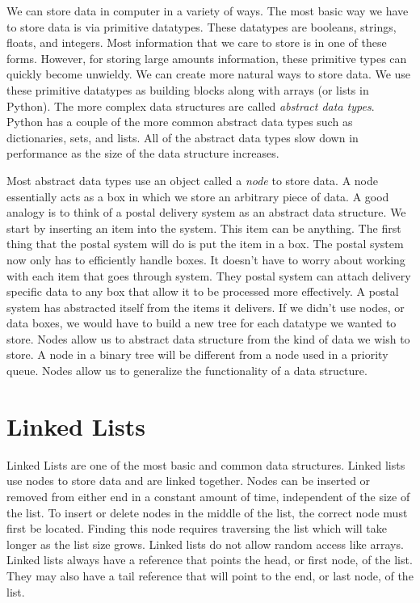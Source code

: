 \label{lab:Python_DataStructures}

We can store data in computer in a variety of ways.
The most basic way we have to store data is via primitive datatypes.
These datatypes are booleans, strings, floats, and integers.
Most information that we care to store is in one of these forms.
However, for storing large amounts information, these primitive types can quickly become unwieldy.
We can create more natural ways to store data.  We use these primitive datatypes as building blocks along with arrays (or lists in Python).  
The more complex data structures are called \emph{abstract data types}.
Python has a couple of the more common abstract data types such as dictionaries, sets, and lists.
All of the abstract data types slow down in performance as the size of the data structure increases.

Most abstract data types use an object called a \emph{node} to store data.
A node essentially acts as a box in which we store an arbitrary piece of data.
A good analogy is to think of a postal delivery system as an abstract data structure.
We start by inserting an item into the system.  This item can be anything.
The first thing that the postal system will do is put the item in a box.
The postal system now only has to efficiently handle boxes.
It doesn't have to worry about working with each item that goes through system.
They postal system can attach delivery specific data to any box that allow it to be processed more effectively.
A postal system has abstracted itself from the items it delivers.
If we didn't use nodes, or data boxes, we would have to build a new tree for each datatype we wanted to store.
Nodes allow us to abstract data structure from the kind of data we wish to store.
A node in a binary tree will be different from a node used in a priority queue.
Nodes allow us to generalize the functionality of a data structure.

\section*{Linked Lists}
Linked Lists are one of the most basic and common data structures.
Linked lists use nodes to store data and are linked together.
Nodes can be inserted or removed from either end in a constant amount of time, independent of the size of the list.
To insert or delete nodes in the middle of the list, the correct node must first be located.  
Finding this node requires traversing the list which will take longer as the list size grows.  
Linked lists do not allow random access like arrays.  
Linked lists always have a reference that points the head, or first node, of the list.  
They may also have a tail reference that will point to the end, or last node, of the list.

